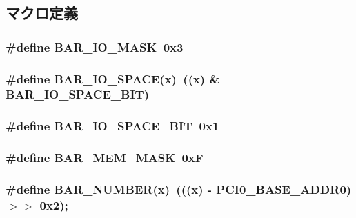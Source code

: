 \subsection{マクロ定義}
\hypertarget{pcidev_8hh_adb92e77e41df55f5ddbacc4cd6379d8f}{
\subsubsection[{BAR\_\-IO\_\-MASK}]{\setlength{\rightskip}{0pt plus 5cm}\#define BAR\_\-IO\_\-MASK~0x3}}
\label{pcidev_8hh_adb92e77e41df55f5ddbacc4cd6379d8f}
\hypertarget{pcidev_8hh_a9856c7a546f6e7459d7f01174babb106}{
\subsubsection[{BAR\_\-IO\_\-SPACE}]{\setlength{\rightskip}{0pt plus 5cm}\#define BAR\_\-IO\_\-SPACE(x)~((x) \& BAR\_\-IO\_\-SPACE\_\-BIT)}}
\label{pcidev_8hh_a9856c7a546f6e7459d7f01174babb106}
\hypertarget{pcidev_8hh_a131d2132bbf95f2e6b4b0393aacefb6c}{
\subsubsection[{BAR\_\-IO\_\-SPACE\_\-BIT}]{\setlength{\rightskip}{0pt plus 5cm}\#define BAR\_\-IO\_\-SPACE\_\-BIT~0x1}}
\label{pcidev_8hh_a131d2132bbf95f2e6b4b0393aacefb6c}
\hypertarget{pcidev_8hh_aeeff9164615dba258d21ae649d024780}{
\subsubsection[{BAR\_\-MEM\_\-MASK}]{\setlength{\rightskip}{0pt plus 5cm}\#define BAR\_\-MEM\_\-MASK~0xF}}
\label{pcidev_8hh_aeeff9164615dba258d21ae649d024780}
\hypertarget{pcidev_8hh_a56edbfa92e6d6b7c11041ffe33121e9f}{
\subsubsection[{BAR\_\-NUMBER}]{\setlength{\rightskip}{0pt plus 5cm}\#define BAR\_\-NUMBER(x)~(((x) -\/ PCI0\_\-BASE\_\-ADDR0) $>$$>$ 0x2);}}
\label{pcidev_8hh_a56edbfa92e6d6b7c11041ffe33121e9f}
